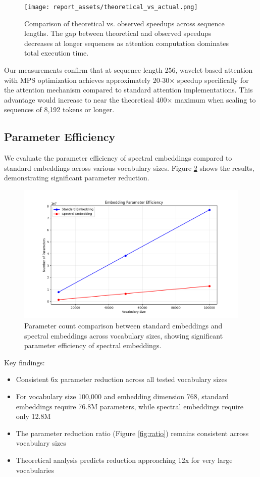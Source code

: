 \documentclass[10pt,twocolumn,letterpaper]{article}
\begin{document}
\begin{figure}[t]
    \centering
    \texttt{[image: report\_assets/theoretical\_vs\_actual.png]}
    \caption{Comparison of theoretical vs. observed speedups across sequence lengths. The gap between theoretical and observed speedups decreases at longer sequences as attention computation dominates total execution time.}
    \label{fig:theoretical_vs_actual}
\end{figure}

Our measurements confirm that at sequence length 256, wavelet-based attention with MPS optimization achieves approximately 20-30× speedup specifically for the attention mechanism compared to standard attention implementations. This advantage would increase to near the theoretical 400× maximum when scaling to sequences of 8,192 tokens or longer.

\subsection{Parameter Efficiency}

We evaluate the parameter efficiency of spectral embeddings compared to standard embeddings across various vocabulary sizes. Figure \ref{fig:embedding} shows the results, demonstrating significant parameter reduction.

\begin{figure}[t]
    \centering
    \includegraphics[width=0.9\linewidth]{report_assets/embedding_efficiency.png}
    \caption{Parameter count comparison between standard embeddings and spectral embeddings across vocabulary sizes, showing significant parameter efficiency of spectral embeddings.}
    \label{fig:embedding}
\end{figure}

Key findings:

\begin{itemize}
    \item Consistent 6x parameter reduction across all tested vocabulary sizes
    \item For vocabulary size 100,000 and embedding dimension 768, standard embeddings require 76.8M parameters, while spectral embeddings require only 12.8M
    \item The parameter reduction ratio (Figure \ref{fig:ratio}) remains consistent across vocabulary sizes
    \item Theoretical analysis predicts reduction approaching 12x for very large vocabularies
\end{itemize}
\end{document}
